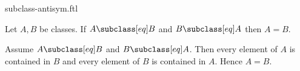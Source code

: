 \documentclass{article}
\begin{document}
\begin{smodule}[creators={Marcel Schütz}]{subclass-antisym.ftl}

  \begin{fproposition*}[label=7159957847801856]
    Let $A, B$ be classes.
    If $A \subclass[eq] B$ and $B \subclass[eq] A$ then $A = B$.
  \end{fproposition*}
  \begin{fproof}
    Assume $A \subclass[eq] B$ and $B \subclass[eq] A$.
    Then every element of $A$ is contained in $B$ and every element of $B$ is contained in $A$.
    Hence $A = B$.
  \end{fproof}
\end{smodule}
\end{document}
